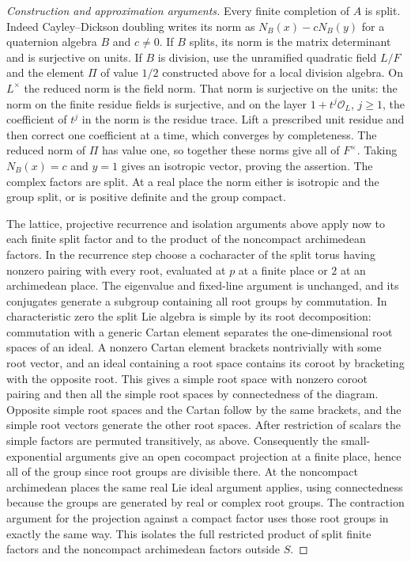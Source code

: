 \documentclass[11pt,a4paper,openany,oneside]{book}
\theoremstyle{resultstyle}
\theoremstyle{definition}
\numberwithin{equation}{chapter}
\begin{document}
\begin{proof}[Construction and approximation arguments]
Every finite completion of \(A\) is split. Indeed
Cayley--Dickson doubling writes its norm as
\(N_B(x)-cN_B(y)\) for a quaternion algebra \(B\) and
\(c\ne0\). If \(B\) splits, its norm is the matrix
determinant and is surjective on units. If \(B\) is
division, use the unramified quadratic field \(L/F\) and
the element \(\Pi\) of value \(1/2\) constructed above
for a local division algebra. On \(L^\times\) the reduced
norm is the field norm. That norm is surjective on the
units: the norm on the finite residue fields is surjective,
and on the layer \(1+t^j\mathcal O_L\), \(j\geq1\), the
coefficient of \(t^j\) in the norm is the residue trace.
Lift a prescribed unit residue and then correct one
coefficient at a time, which converges by completeness.
The reduced norm of \(\Pi\) has value one, so together these
norms give all of \(F^\times\). Taking \(N_B(x)=c\)
and \(y=1\) gives an isotropic vector, proving the assertion.
The complex factors are split. At a real place the norm
either is isotropic and the group split, or is positive
definite and the group compact.

The lattice, projective recurrence and isolation arguments
above apply now to each finite split factor and to the
product of the noncompact archimedean factors. In the
recurrence step choose a cocharacter of the split torus
having nonzero pairing with every root, evaluated at \(p\)
at a finite place or \(2\) at an archimedean place.
The eigenvalue and fixed-line argument is unchanged,
and its conjugates generate a subgroup containing all root
groups by commutation. In characteristic zero the split
Lie algebra is simple by its root decomposition:
commutation with a generic Cartan element separates the
one-dimensional root spaces of an ideal. A nonzero Cartan
element brackets nontrivially with some root vector, and
an ideal containing a root space contains its coroot by
bracketing with the opposite root. This gives a simple
root space with nonzero coroot pairing and then all the
simple root spaces by connectedness of the diagram.
Opposite simple root spaces and the Cartan follow by
the same brackets, and the simple root vectors generate the
other root spaces. After restriction of scalars the simple
factors are permuted transitively, as above. Consequently
the small-exponential arguments give an open cocompact
projection at a finite place, hence all of the group since
root groups are divisible there. At the noncompact
archimedean places the same real Lie ideal argument applies,
using connectedness because the groups are generated by
real or complex root groups. The contraction argument for
the projection against a compact factor uses those root
groups in exactly the same way. This isolates the full
restricted product of split finite factors and the
noncompact archimedean factors outside \(S\).


\end{proof}
\end{document}
